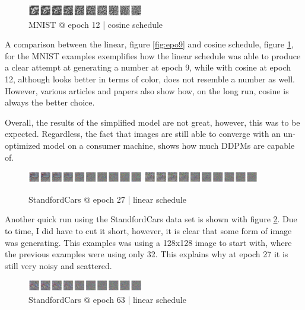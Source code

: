 \documentclass[conference]{IEEEtran}
\begin{document}
\begin{figure}[htbp]
    \centering
    \includegraphics[width=0.45\textwidth]{../images/epoch12.png}
    \caption{MNIST @ epoch 12 | cosine schedule}
    \label{fig:epo12}
\end{figure}

A comparison between the linear, figure \ref{fig:epo9} and cosine schedule,
figure \ref{fig:epo12}, for the MNIST examples exemplifies how the linear
schedule was able to produce a clear attempt at generating a number at epoch 9,
while with cosine at epoch 12, although looks better in terms of color, does
not resemble a number as well. However, various articles and papers also show
how, on the long run, cosine is always the better choice.

Overall, the results of the simplified model are not great, however, this was
to be expected. Regardless, the fact that images are still able to converge
with an un-optimized model on a consumer machine, shows how much DDPMs are
capable of.

\begin{figure}[htbp]
    \centering
    \includegraphics[width=0.45\textwidth]{../images/epoch27-0.png}
    \includegraphics[width=0.45\textwidth]{../images/epoch27-1.png}
    \caption{StandfordCars @ epoch 27 | linear schedule}
    \label{fig:epo27}
\end{figure}

Another quick run using the StandfordCars data set is shown with figure
\ref{fig:epo27}. Due to time, I did have to cut it short, however, it is clear
that some form of image was generating. This examples was using a 128x128 image
to start with, where the previous examples were using only 32. This explains
why at epoch 27 it is still very noisy and scattered.

\begin{figure}[htbp]
    \centering
    \includegraphics[width=0.45\textwidth]{../images/epoch63.png}
    \caption{StandfordCars @ epoch 63 | linear schedule}
    \label{fig:epo63}
\end{figure}
\end{document}
